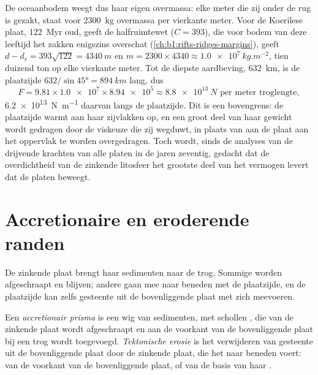De oceaanbodem weegt dus haar eigen overmassa: elke meter die zij onder de rug is gezakt, staat voor \qty{2300}{kg} overmassa per vierkante meter. Voor de Koerilese plaat, \qty{122}{Myr} oud, geeft de halfruimtewet ($C = 393$), die voor bodem van deze leeftijd het zakken enigszins overschat (\cref{ch:b1:rifts-ridges-margins}),
geeft $d - d_r = 393\sqrt{122} = \qty{4340}{m}$ en
$m = 2300\times4340 \approx \qty{1.0e7}{kg.m^{-2}}$, tien duizend ton op elke vierkante meter. Tot de diepste aardbeving, \qty{632}{km}, is de plaatzijde
$632/\sin\ang{45} = \qty{894}{km}$ lang, dus
\[
  F = 9.81 \times \num{1.0e7} \times \num{8.94e5} \approx \qty{8.8e13}{N}
  \text{ per meter troglengte},
\]
\qty{6.2e13}{N.m^{-1}} daarvan langs de plaatzijde. Dit is een bovengrens: de plaatzijde warmt aan haar zijvlakken op, en een groot deel van haar gewicht wordt gedragen door de viskeuze  die zij wegduwt, in plaats van aan de plaat aan het oppervlak te worden overgedragen. Toch wordt, sinds de analyses van de drijvende krachten van alle platen in de jaren zeventig, gedacht dat de overdichtheid van de zinkende litosfeer het grootste deel van het vermogen levert dat de platen beweegt.

\section{Accretionaire en eroderende randen}\label{sec:b1:active-margins:prisms}

De zinkende plaat brengt haar sedimenten naar de trog. Sommige worden afgeschraapt en blijven; andere gaan mee naar beneden met de plaatzijde, en de plaatzijde kan zelfs gesteente uit de bovenliggende plaat met zich meevoeren.

\begin{definition}\label{def:b1:active-margins:accretionary}
Een \emph{accretionair prisma} is een wig van sedimenten, met schollen , die van de zinkende plaat wordt afgeschraapt en aan de voorkant van de bovenliggende plaat bij een trog wordt toegevoegd. \emph{Tektonische erosie} is het verwijderen van gesteente uit de bovenliggende plaat door de zinkende plaat, die het naar beneden voert: van de voorkant van de bovenliggende plaat, of van de basis van haar .
\end{definition}

